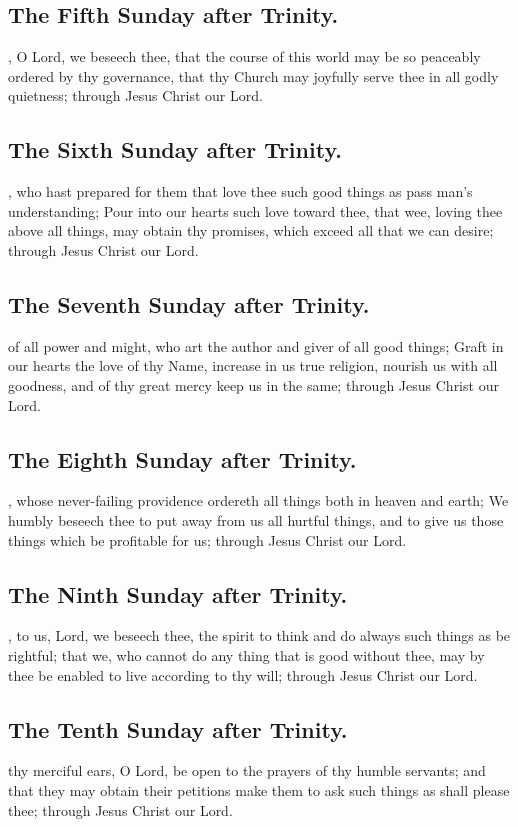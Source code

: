 \subsection{The Fifth Sunday after Trinity.}
, O Lord, we beseech thee, that the course of this world may be so peaceably ordered by thy governance, that thy Church may joyfully serve thee in all godly quietness; through Jesus Christ our Lord.

\subsection{The Sixth Sunday after Trinity.}
, who hast prepared for them that love thee such good things as pass man's understanding; Pour into our hearts such love toward thee, that wee, loving thee above all things, may obtain thy promises, which exceed all that we can desire; through Jesus Christ our Lord.

\subsection{The Seventh Sunday after Trinity.}
 of all power and might, who art the author and giver of all good things; Graft in our hearts the love of thy Name, increase in us true religion, nourish us with all goodness, and of thy great mercy keep us in the same; through Jesus Christ our Lord.

\subsection{The Eighth Sunday after Trinity.}
, whose never-failing providence ordereth all things both in heaven and earth; We humbly beseech thee to put away from us all hurtful things, and to give us those things which be profitable for us; through Jesus Christ our Lord.

\subsection{The Ninth Sunday after Trinity.}
, to us, Lord, we beseech thee, the spirit to think and do always such things as be rightful; that we, who cannot do any thing that is good without thee, may by thee be enabled to live according to thy will; through Jesus Christ our Lord.

\subsection{The Tenth Sunday after Trinity.}
 thy merciful ears, O Lord, be open to the prayers of thy humble servants; and that they may obtain their petitions make them to ask such things as shall please thee; through Jesus Christ our Lord.

